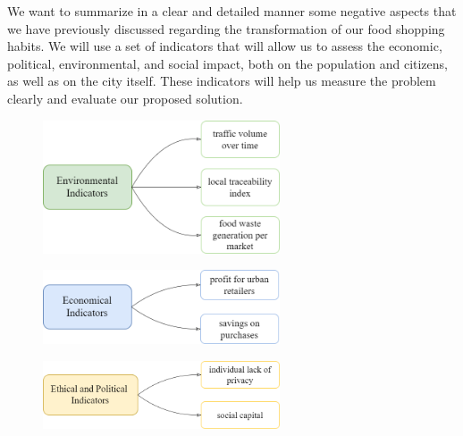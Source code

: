 We want to summarize in a clear and detailed manner some negative aspects that we have previously discussed regarding the transformation of our food shopping habits. We will use a set of indicators that will allow us to assess the economic, political, environmental, and social impact, both on the population and citizens, as well as on the city itself. These indicators will help us measure the problem clearly and evaluate our proposed solution.

    \begin{figure}[h!]
        \centering
        \includegraphics[width=7cm]{figs/env}
        \label{fig:env}
      \end{figure}
    

 
    \begin{figure}[h!]
        \centering
        \includegraphics[width=7cm]{figs/econ}
        \label{fig:env}
      \end{figure}


    \begin{figure}[h!]
        \centering
        \includegraphics[width=7cm]{figs/health}
        \label{fig:env}
      \end{figure}


